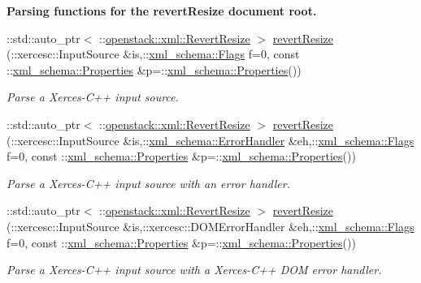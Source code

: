 \begin{Indent}{\bf Parsing functions for the revertResize document root.}
\begin{DoxyCompactItemize}
::std::auto\_\-ptr$<$ ::\hyperlink{classopenstack_1_1xml_1_1RevertResize}{openstack::xml::RevertResize} $>$ \hyperlink{namespaceopenstack_1_1xml_a858128543d78d75738e0411ab2f2c144}{revertResize} (::xercesc::InputSource \&is,::\hyperlink{namespacexml__schema_affb4c227cbd9aa7453dd1dc5a1401943}{xml\_\-schema::Flags} f=0, const ::\hyperlink{namespacexml__schema_ad27ce19a7ee1d3b1064092648898f64c}{xml\_\-schema::Properties} \&p=::\hyperlink{namespacexml__schema_ad27ce19a7ee1d3b1064092648898f64c}{xml\_\-schema::Properties}())
\begin{DoxyCompactList}\small\item\em Parse a Xerces-\/C++ input source. \item\end{DoxyCompactList}\item 
::std::auto\_\-ptr$<$ ::\hyperlink{classopenstack_1_1xml_1_1RevertResize}{openstack::xml::RevertResize} $>$ \hyperlink{namespaceopenstack_1_1xml_ad6c926badc59b81705b2937beeb038d4}{revertResize} (::xercesc::InputSource \&is,::\hyperlink{namespacexml__schema_ab1c9361bfd3b404eaabf0c31eded79dc}{xml\_\-schema::ErrorHandler} \&eh,::\hyperlink{namespacexml__schema_affb4c227cbd9aa7453dd1dc5a1401943}{xml\_\-schema::Flags} f=0, const ::\hyperlink{namespacexml__schema_ad27ce19a7ee1d3b1064092648898f64c}{xml\_\-schema::Properties} \&p=::\hyperlink{namespacexml__schema_ad27ce19a7ee1d3b1064092648898f64c}{xml\_\-schema::Properties}())
\begin{DoxyCompactList}\small\item\em Parse a Xerces-\/C++ input source with an error handler. \item\end{DoxyCompactList}\item 
::std::auto\_\-ptr$<$ ::\hyperlink{classopenstack_1_1xml_1_1RevertResize}{openstack::xml::RevertResize} $>$ \hyperlink{namespaceopenstack_1_1xml_a6909b46aee2b95b8b1db4e4637c1e544}{revertResize} (::xercesc::InputSource \&is,::xercesc::DOMErrorHandler \&eh,::\hyperlink{namespacexml__schema_affb4c227cbd9aa7453dd1dc5a1401943}{xml\_\-schema::Flags} f=0, const ::\hyperlink{namespacexml__schema_ad27ce19a7ee1d3b1064092648898f64c}{xml\_\-schema::Properties} \&p=::\hyperlink{namespacexml__schema_ad27ce19a7ee1d3b1064092648898f64c}{xml\_\-schema::Properties}())
\begin{DoxyCompactList}\small\item\em Parse a Xerces-\/C++ input source with a Xerces-\/C++ DOM error handler. \item\end{DoxyCompactList}\item 

\end{DoxyCompactItemize}
\end{Indent}
